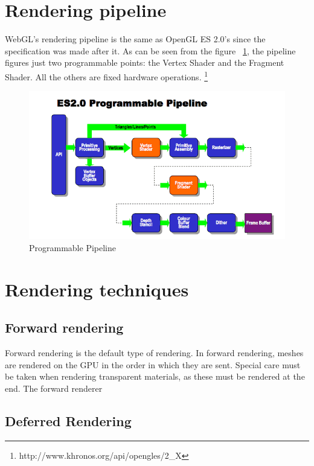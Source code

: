 \section{Rendering pipeline}

WebGL’s rendering pipeline is the same as OpenGL ES 2.0’s since the specification was made after it. As can be seen from the figure ~\ref{img:opengles1}, the pipeline figures just two programmable points: the Vertex Shader and the Fragment Shader. All the others are fixed hardware operations. \footnote{http://www.khronos.org/api/opengles/2\_X}

 \begin{center}
	\begin{figure}[here]
		
		\includegraphics[width=\textwidth]{src/img/opengles2.png}
		\caption{Programmable Pipeline}
		\label{img:opengles1}
	\end{figure}
\end{center}

\section{Rendering techniques}

\subsection{Forward rendering}

Forward rendering is the default type of rendering. In forward rendering, meshes are rendered on the GPU in the order in which they are sent. Special care must be taken when rendering transparent materials, as these must be rendered at the end. The forward renderer 

\subsection{Deferred Rendering}


